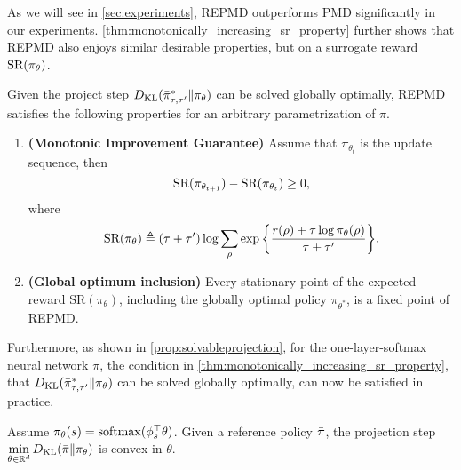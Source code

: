 As we will see in \cref{sec:experiments}, REPMD outperforms PMD significantly in our experiments. 
\cref{thm:monotonically_increasing_sr_property} further shows that REPMD also enjoys similar desirable properties, but on a surrogate reward $\text{SR}(\pi_\theta) $.
\begin{thm}
\label{thm:monotonically_increasing_sr_property}
Given the project step $D_{\mathrm{KL}}( \bar{\pi}_{\tau,\tau^{\prime}}^* \| \pi_\theta )$ can be solved globally optimally, REPMD satisfies the following properties for an arbitrary parametrization of $\pi$.
\begin{enumerate}
	\item {\bf (Monotonic Improvement Guarantee)} 
	Assume that $\pi_{\theta_{t}}$ is the update sequence, then 
	\begin{equation*}
	\text{SR}(\pi_{\theta_{t+1}}) - \text{SR}(\pi_{\theta_t})\ge 0,
	\end{equation*}
	where
	\begin{equation}
	\label{eq:SR}
	\text{SR}(\pi_\theta) \triangleq (\tau + \tau^{\prime})\log{ \sum_{\rho}{ \exp\left\{ \frac{r(\rho) + \tau \log{\pi_\theta(\rho)} }{\tau + \tau^{\prime}} \right\} }}.
	\end{equation}
	\item {\bf (Global optimum inclusion)} Every stationary point of the expected reward $\text{SR}(\pi_\theta)$, including the globally optimal policy $\pi_{\theta^*}$,  is a fixed point of REPMD. 
\end{enumerate}
\end{thm}

Furthermore, as shown in \cref{prop:solvableprojection}, 
for the one-layer-softmax neural network $\pi$, the condition in \cref{thm:monotonically_increasing_sr_property}, that $D_{\mathrm{KL}}( \bar{\pi}_{\tau,\tau^{\prime}}^* \| \pi_\theta )$ can be solved globally optimally, can now be satisfied in practice.
\begin{prop}
	\label{prop:solvableprojection}
	Assume $\pi_\theta(s) = \mathrm{softmax}(\phi_s^{\top}\theta)$. Given a reference policy $\bar{\pi}$, the projection step $\min\limits_{\theta \in \mathbb{R}^d}{D_{\mathrm{KL}}(\bar{\pi} \| \pi_\theta)}$ is convex in $\theta$.
\end{prop}


